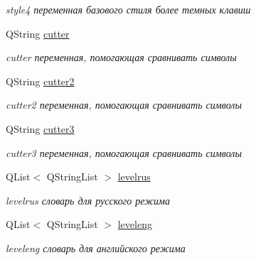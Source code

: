 \begin{DoxyCompactItemize}
\begin{DoxyCompactList}\small\item\em style4 переменная базового стиля более темных клавиш \end{DoxyCompactList}\item 
\mbox{\label{class_main_window_a702bd72a6a4a54edc7ccf7935afcfa89}} 
Q\+String \mbox{\hyperlink{class_main_window_a702bd72a6a4a54edc7ccf7935afcfa89}{cutter}}
\begin{DoxyCompactList}\small\item\em cutter переменная, помогающая сравнивать символы \end{DoxyCompactList}\item 
\mbox{\label{class_main_window_a00bf603f62935c719fb4fd9805d4969b}} 
Q\+String \mbox{\hyperlink{class_main_window_a00bf603f62935c719fb4fd9805d4969b}{cutter2}}
\begin{DoxyCompactList}\small\item\em cutter2 переменная, помогающая сравнивать символы \end{DoxyCompactList}\item 
\mbox{\label{class_main_window_ae5ec6ab9dface962ed77899df0531da2}} 
Q\+String \mbox{\hyperlink{class_main_window_ae5ec6ab9dface962ed77899df0531da2}{cutter3}}
\begin{DoxyCompactList}\small\item\em cutter3 переменная, помогающая сравнивать символы \end{DoxyCompactList}\item 
\mbox{\label{class_main_window_a58639d54c726434c7143a73f4a978e68}} 
Q\+List$<$ Q\+String\+List $>$ \mbox{\hyperlink{class_main_window_a58639d54c726434c7143a73f4a978e68}{levelrus}}
\begin{DoxyCompactList}\small\item\em levelrus словарь для русского режима \end{DoxyCompactList}\item 
\mbox{\label{class_main_window_a8e48301de254cc58ce0c8a460fe40d90}} 
Q\+List$<$ Q\+String\+List $>$ \mbox{\hyperlink{class_main_window_a8e48301de254cc58ce0c8a460fe40d90}{leveleng}}
\begin{DoxyCompactList}\small\item\em leveleng словарь для английского режима \end{DoxyCompactList}\item 

\end{DoxyCompactItemize}
